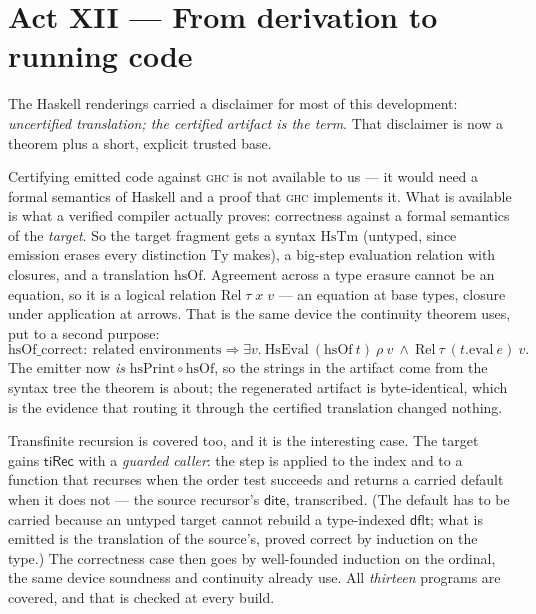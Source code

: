 \section{Act XII --- From derivation to running code}

The Haskell renderings carried a disclaimer for most of this development:
\emph{uncertified translation; the certified artifact is the term}. That
disclaimer is now a theorem plus a short, explicit trusted base.

Certifying emitted code against \textsc{ghc} is not available to us --- it
would need a formal semantics of Haskell and a proof that \textsc{ghc}
implements it. What is available is what a verified compiler actually proves:
correctness against a formal semantics of the \emph{target}. So the target
fragment gets a syntax $\mathrm{HsTm}$ (untyped, since emission erases every
distinction $\mathrm{Ty}$ makes), a big-step evaluation relation with closures, and a
translation $\mathrm{hsOf}$. Agreement across a type erasure cannot be an
equation, so it is a logical relation $\mathrm{Rel}\;\tau\;x\;v$ --- an
equation at base types, closure under application at arrows. That is the same
device the continuity theorem uses, put to a second purpose:
\[
  \mathrm{hsOf\_correct} :\ \text{related environments} \Rightarrow
  \exists v.\ \mathrm{HsEval}\ (\mathrm{hsOf}\ t)\ \rho\ v \ \wedge\
  \mathrm{Rel}\ \tau\ (t.\mathrm{eval}\ e)\ v .
\]
The emitter now \emph{is} $\mathrm{hsPrint} \circ \mathrm{hsOf}$, so the
strings in the artifact come from the syntax tree the theorem is about; the
regenerated artifact is byte-identical, which is the evidence that routing it
through the certified translation changed nothing.

Transfinite recursion is covered too, and it is the interesting case. The
target gains $\mathsf{tiRec}$ with a \emph{guarded caller}: the step is
applied to the index and to a function that recurses when the order test
succeeds and returns a carried default when it does not --- the source
recursor's $\mathsf{dite}$, transcribed. (The default has to be carried
because an untyped target cannot rebuild a type-indexed $\mathsf{dflt}$; what
is emitted is the translation of the source's, proved correct by induction on
the type.) The correctness case then goes by well-founded induction on the
ordinal, the same device soundness and continuity already use. All
\emph{thirteen} programs are covered, and that is checked at every build.

